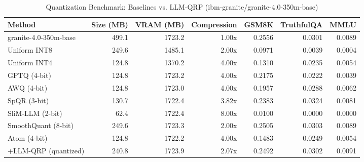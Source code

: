 \begin{table}[htbp]
  \centering
  \small
  \caption{Quantization Benchmark: Baselines vs. LLM-QRP (ibm-granite/granite-4.0-350m-base)}
  \label{tab:benchmark}
  \begin{tabular}{lrrrrrr}
    \toprule
    \textbf{Method} & \textbf{Size (MB)} & \textbf{VRAM (MB)} & \textbf{Compression} & \textbf{GSM8K} & \textbf{TruthfulQA} & \textbf{MMLU} \\
    \midrule
    granite-4.0-350m-base & 499.1 & 1723.2 & 1.00x & 0.2556 & 0.0301 & 0.0089 \\
    Uniform INT8 & 249.6 & 1485.1 & 2.00x & 0.0971 & 0.0039 & 0.0004 \\
    Uniform INT4 & 124.8 & 1370.2 & 4.00x & 0.1310 & 0.0235 & 0.0054 \\
    GPTQ (4-bit) & 124.8 & 1723.2 & 4.00x & 0.2175 & 0.0222 & 0.0039 \\
    AWQ (4-bit) & 124.8 & 1723.0 & 4.00x & 0.1957 & 0.0288 & 0.0062 \\
    SpQR (3-bit) & 130.7 & 1722.4 & 3.82x & 0.2383 & 0.0324 & 0.0081 \\
    SliM-LLM (2-bit) & 62.4 & 1722.4 & 8.00x & 0.0100 & 0.0000 & 0.0000 \\
    SmoothQuant (8-bit) & 249.6 & 1723.3 & 2.00x & 0.2505 & 0.0303 & 0.0089 \\
    Atom (4-bit) & 124.8 & 1722.2 & 4.00x & 0.1483 & 0.0249 & 0.0054 \\
    \midrule
    +LLM-QRP (quantized) & 240.8 & 1723.9 & 2.07x & 0.2492 & 0.0302 & 0.0091 \\
    \bottomrule
  \end{tabular}
\end{table}
